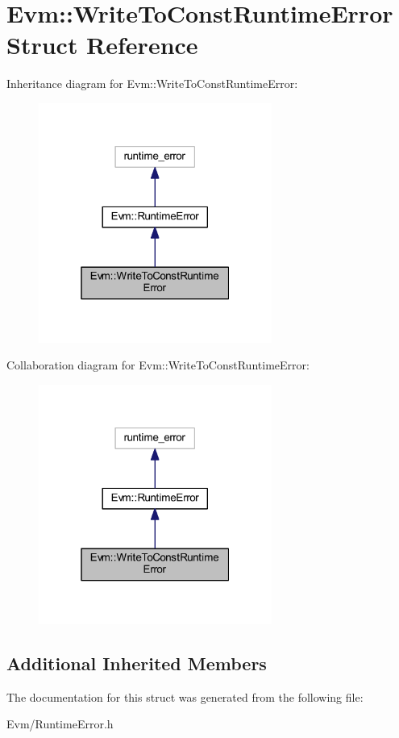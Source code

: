 \hypertarget{struct_evm_1_1_write_to_const_runtime_error}{}\section{Evm\+:\+:Write\+To\+Const\+Runtime\+Error Struct Reference}
\label{struct_evm_1_1_write_to_const_runtime_error}


Inheritance diagram for Evm\+:\+:Write\+To\+Const\+Runtime\+Error\+:
\nopagebreak
\begin{figure}[H]
\begin{center}
\leavevmode
\includegraphics[width=217pt]{struct_evm_1_1_write_to_const_runtime_error__inherit__graph}
\end{center}
\end{figure}


Collaboration diagram for Evm\+:\+:Write\+To\+Const\+Runtime\+Error\+:
\nopagebreak
\begin{figure}[H]
\begin{center}
\leavevmode
\includegraphics[width=217pt]{struct_evm_1_1_write_to_const_runtime_error__coll__graph}
\end{center}
\end{figure}
\subsection*{Additional Inherited Members}


The documentation for this struct was generated from the following file\+:\begin{DoxyCompactItemize}
\item 
Evm/Runtime\+Error.\+h\end{DoxyCompactItemize}
